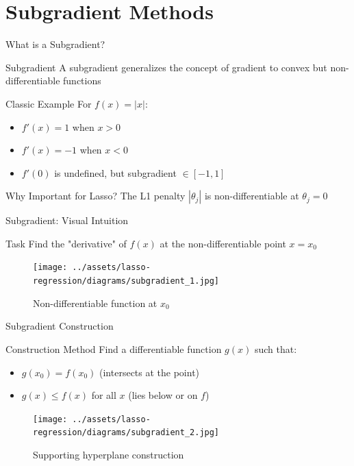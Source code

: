 \documentclass{beamer}
\begin{document}
\section{Subgradient Methods}

\begin{frame}{What is a Subgradient?}
\begin{definitionbox}{Subgradient}
A subgradient generalizes the concept of gradient to convex but non-differentiable functions
\end{definitionbox}
\pause

\begin{examplebox}{Classic Example}
For $f(x) = |x|$:
\begin{itemize}
\item $f'(x) = 1$ when $x > 0$
\item $f'(x) = -1$ when $x < 0$  
\item $f'(0)$ is undefined, but subgradient $\in [-1, 1]$
\end{itemize}
\end{examplebox}
\pause

\begin{alertbox}{Why Important for Lasso?}
The L1 penalty $|\theta_j|$ is non-differentiable at $\theta_j = 0$
\end{alertbox}
\end{frame}

\begin{frame}{Subgradient: Visual Intuition}
\begin{alertbox}{Task}
Find the "derivative" of $f(x)$ at the non-differentiable point $x = x_0$
\end{alertbox}

\begin{figure}
\centering
\texttt{[image: ../assets/lasso-regression/diagrams/subgradient\_1.jpg]}
\caption{{\footnotesize Non-differentiable function at $x_0$}}
\label{fig:Non-differentiable function}
\end{figure}
\end{frame}

\begin{frame}{Subgradient Construction}
\begin{codebox}{Construction Method}
Find a differentiable function $g(x)$ such that:
\begin{itemize}
\item $g(x_0) = f(x_0)$ (intersects at the point)
\item $g(x) \leq f(x)$ for all $x$ (lies below or on $f$)
\end{itemize}
\end{codebox}

\begin{figure}
\centering
\texttt{[image: ../assets/lasso-regression/diagrams/subgradient\_2.jpg]}
\caption{{\footnotesize Supporting hyperplane construction}}
\label{fig:my_label}
\end{figure}
\end{frame}
\end{document}
